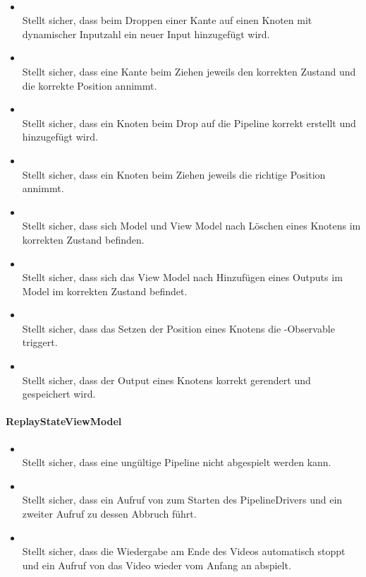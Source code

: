 \paragraph{}
\begin{itemize}
	\item {} \\
	Stellt sicher, dass beim Droppen einer Kante auf einen Knoten mit dynamischer Inputzahl ein neuer Input hinzugefügt wird.
	\item {} \\
	Stellt sicher, dass eine Kante beim Ziehen jeweils den korrekten Zustand und die korrekte Position annimmt.
	\item {} \\
	Stellt sicher, dass ein Knoten beim Drop auf die Pipeline korrekt erstellt und hinzugefügt wird.
	\item {} \\
	Stellt sicher, dass ein Knoten beim Ziehen jeweils die richtige Position annimmt.
	\item {} \\
	Stellt sicher, dass sich Model und View Model nach Löschen eines Knotens im korrekten Zustand befinden.
	\item {} \\
	Stellt sicher, dass sich das View Model nach Hinzufügen eines Outputs im Model im korrekten Zustand befindet.
	\item {} \\
	Stellt sicher, dass das Setzen der Position eines Knotens die -Observable triggert.
	\item {} \\
	Stellt sicher, dass der Output eines Knotens korrekt gerendert und gespeichert wird.
\end{itemize}

\paragraph{ReplayStateViewModel}
\begin{itemize}
	\item {} \\
	Stellt sicher, dass eine ungültige Pipeline nicht abgespielt werden kann.
	\item {} \\
	Stellt sicher, dass ein Aufruf von  zum Starten des PipelineDrivers und ein zweiter Aufruf zu dessen Abbruch führt.
	\item {} \\
	Stellt sicher, dass die Wiedergabe am Ende des Videos automatisch stoppt und ein Aufruf von  das Video wieder vom Anfang an abspielt.
\end{itemize}

